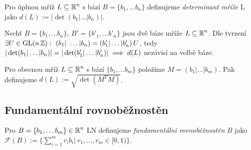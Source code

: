 \begin{definition}
Pro úplnou mříž $L \subseteq \operatorname{\mathbb{R}}^n$ s bází $B=\{b_1,\dots b_n\}$ definujeme \emph{determinant mříže} L jako $d(L) := |\det(b_1 | \dots | b_n)|$.
\end{definition}

\begin{note}
Nechť $B=\{b_1,\dots b_n\}$, $B'=\{b'_1,\dots b'_n\}$ jsou dvě báze mříže $L \subseteq \operatorname{\mathbb{R}}^n$. Dle tvrzení $\exists U \in \operatorname{GL}(n\operatorname{\mathbb{Z}}): \ \left( b_1| \ \dots | b_n\right) = \left( b'_1 | \dots | b'_n \right)U$, tedy $|\det(b_1 | \dots | b_n)| = |\det(b'_1 | \dots | b'_n)|\\ \implies d(L)$ nezávisí na volbě báze.
\end{note}

\begin{definition}
Pro obecnou mříž $L \subseteq \operatorname{\mathbb{R}}^n$ s bází $\{b_1,\dots b_m\}$ položíme $M = \left( b_1 | \dots | b_m \right)$. Pak definujeme $d(L) := \sqrt{\det(M^TM)}$.
\end{definition}

\subsection{Fundamentální rovnoběžnostěn}
\begin{definition}
Pro $B = \{b_1,\dots b_m\} \in \operatorname{\mathbb{R}}^n$ LN definujeme \emph{fundamentální rovnoběžnostěn} $B$ jako $\mathcal{F}(B) := \{\sum_{i=1}^m r_i b_i | \ r_1,\dots,r_m \in [0,1)\}$.
\end{definition}

